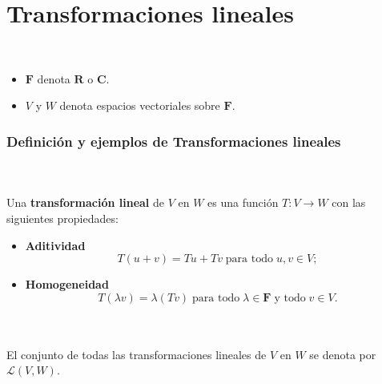 \chapter{Transformaciones lineales}

\begin{mynot}[\boldmath $F,V,W$]\,\\
    \begin{itemize}
	\item $\textbf{F}$ denota $\textbf{R}$ o $\textbf{C}$.
	\item $V$ y $W$ denota espacios vectoriales sobre $\textbf{F}$.
    \end{itemize}
\end{mynot}
\vspace{.5cm}

\vspace{.2cm}

\subsection*{Definición y ejemplos de Transformaciones lineales}

\begin{mydef}\;\\\\
	Una \textbf{transformación lineal} de $V$ en $W$ es una función $T:V\to W$ con las siguientes propiedades:

	\begin{itemize}
	    \item \textbf{Aditividad}
		$$T(u+ v)=Tu+ Tv \;\mbox{para todo}\; u,v\in V;$$
	    \item \textbf{Homogeneidad}
		$$T(\lambda v)=\lambda(Tv) \;\mbox{para todo}\; \lambda\in \textbf{F}\; \mbox{y todo}\; v\in V.$$
	\end{itemize}
\end{mydef}

\begin{mynot}\; \\\\
    El conjunto de todas las transformaciones lineales de $V$ en $W$ se denota por $\mathcal{L}(V,W)$.
\end{mynot}

